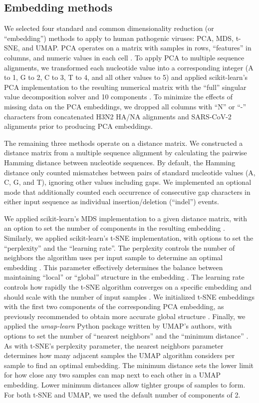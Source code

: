 \documentclass[10pt,letterpaper]{article}
\begin{document}
\subsection*{Embedding methods}

We selected four standard and common dimensionality reduction (or ``embedding'') methods to apply to human pathogenic viruses: PCA, MDS, t-SNE, and UMAP.
PCA operates on a matrix with samples in rows, ``features'' in columns, and numeric values in each cell \cite{jolliffe_cadima_2016}.
To apply PCA to multiple sequence alignments, we transformed each nucleotide value into a corresponding integer (A to 1, G to 2, C to 3, T to 4, and all other values to 5) and applied scikit-learn's PCA implementation to the resulting numerical matrix with the ``full'' singular value decomposition solver and 10 components \cite{Pedregosa2011}.
To minimize the effects of missing data on the PCA embeddings, we dropped all columns with ``N'' or ``-'' characters from concatenated H3N2 HA/NA alignments and SARS-CoV-2 alignments prior to producing PCA embeddings.

The remaining three methods operate on a distance matrix.
We constructed a distance matrix from a multiple sequence alignment by calculating the pairwise Hamming distance between nucleotide sequences.
By default, the Hamming distance only counted mismatches between pairs of standard nucleotide values (A, C, G, and T), ignoring other values including gaps.
We implemented an optional mode that additionally counted each occurrence of consecutive gap characters in either input sequence as individual insertion/deletion (``indel'') events.

We applied scikit-learn's MDS implementation to a given distance matrix, with an option to set the number of components in the resulting embedding \cite{Pedregosa2011}.
Similarly, we applied scikit-learn's t-SNE implementation, with options to set the ``perplexity'' and the ``learning rate''.
The perplexity controls the number of neighbors the algorithm uses per input sample to determine an optimal embedding \cite{maaten2008visualizing}.
This parameter effectively determines the balance between maintaining ``local'' or ``global'' structure in the embedding \cite{kobak_2019}.
The learning rate controls how rapidly the t-SNE algorithm converges on a specific embedding \cite{Jacobs1988,maaten2008visualizing} and should scale with the number of input samples \cite{Belkina2019}.
We initialized t-SNE embeddings with the first two components of the corresponding PCA embedding, as previously recommended to obtain more accurate global structure \cite{kobak_2019,kobak_2021}.
Finally, we applied the \textit{umap-learn} Python package written by UMAP's authors, with options to set the number of ``nearest neighbors'' and the ``minimum distance'' \cite{lel2018umap}.
As with t-SNE's perplexity parameter, the nearest neighbors parameter determines how many adjacent samples the UMAP algorithm considers per sample to find an optimal embedding.
The minimum distance sets the lower limit for how close any two samples can map next to each other in a UMAP embedding.
Lower minimum distances allow tighter groups of samples to form.
For both t-SNE and UMAP, we used the default number of components of 2.
\end{document}

